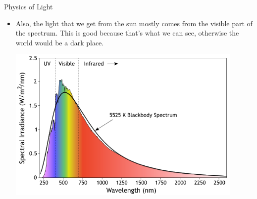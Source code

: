 \documentclass{beamer}
\begin{document}
\begin{frame}{Physics of Light}
\begin{itemize}
   \item Also, the light that we get from the sun mostly comes from the visible part of the spectrum. This is good because that's what we can see, otherwise the world would be a dark place.
   \begin{center}
   \includegraphics[width=0.9\textwidth]{figures/sunspectrum.png}
   \end{center}
\end{itemize}
\end{frame}
\end{document}
